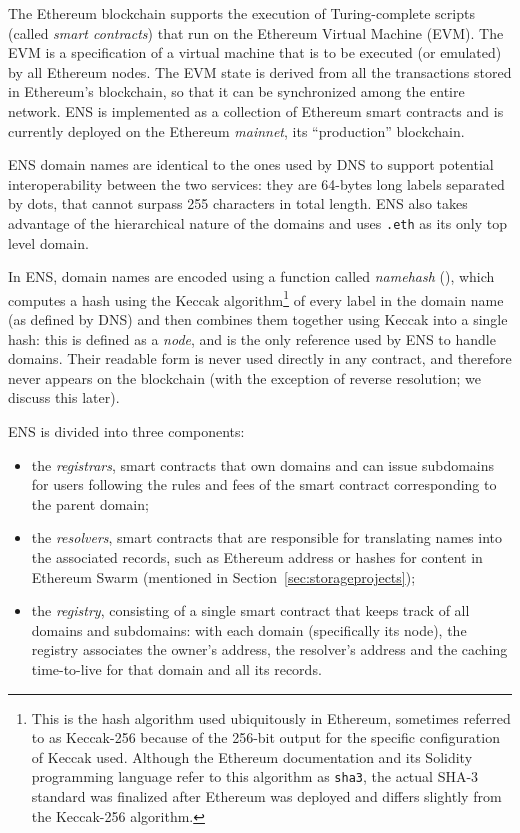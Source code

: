 \documentclass[mscthesis]{usiinfthesis}
\begin{document}
The Ethereum blockchain supports the execution of Turing-complete scripts (called \emph{smart contracts}) that run on the Ethereum Virtual Machine (EVM). The EVM is a specification of a virtual machine that is to be executed (or emulated) by all Ethereum nodes. The EVM state is derived from all the transactions stored in Ethereum's blockchain, so that it can be synchronized among the entire network. ENS is implemented as a collection of Ethereum smart contracts and is currently deployed on the Ethereum \textit{mainnet}, its ``production'' blockchain.

ENS domain names are identical to the ones used by DNS to support potential interoperability between the two services: they are 64-bytes long labels separated by dots, that cannot surpass 255 characters in total length. ENS also takes advantage of the hierarchical nature of the domains and uses \texttt{.eth} as its only top level domain.

In ENS, domain names are encoded using a function called \emph{namehash} (\cite{eip:137}), which computes a hash using the Keccak algorithm\footnote{This is the hash algorithm used ubiquitously in Ethereum, sometimes referred to as Keccak-256 because of the 256-bit output for the specific configuration of Keccak used. Although the Ethereum documentation and its Solidity programming language refer to this algorithm as \texttt{sha3}, the actual SHA-3 standard was finalized after Ethereum was deployed and differs slightly from the Keccak-256 algorithm.} \cite{} %
of every label in the domain name (as defined by DNS) and then combines them together using Keccak into a single hash: this is defined as a \emph{node}, and is the only reference used by ENS to handle domains. Their readable form is never used directly in any contract, and therefore never appears on the blockchain (with the exception of reverse resolution; we discuss this later).

ENS is divided into three components:
\begin{itemize}
	\item the \emph{registrars}, smart contracts that own domains and can issue subdomains for users following the rules and fees of the smart contract corresponding to the parent domain; 
	\item the \emph{resolvers}, smart contracts that are responsible for translating names into the associated records, such as Ethereum address or hashes for content in Ethereum Swarm (mentioned in Section~\ref{sec:storageprojects});
	\item the \emph{registry}, consisting of a single smart contract that keeps track of all domains and subdomains: with each domain (specifically its node), the registry associates the owner's address, the resolver's address and the caching time-to-live for that domain and all its records.
\end{itemize}
\end{document}

